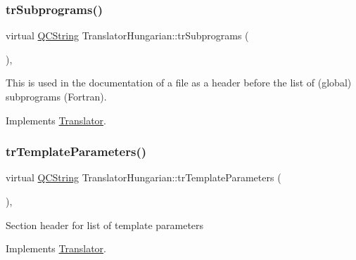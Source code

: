 \mbox{\label{class_translator_hungarian_a309a93a95df91978982b835f764ff20d}} 
\subsubsection{\texorpdfstring{trSubprograms()}{trSubprograms()}}
{\footnotesize\ttfamily virtual \mbox{\hyperlink{class_q_c_string}{Q\+C\+String}} Translator\+Hungarian\+::tr\+Subprograms (\begin{DoxyParamCaption}{ }\end{DoxyParamCaption})\hspace{0.3cm}{\ttfamily [inline]}, {\ttfamily [virtual]}}

This is used in the documentation of a file as a header before the list of (global) subprograms (Fortran). 

Implements \mbox{\hyperlink{class_translator}{Translator}}.

\mbox{\label{class_translator_hungarian_a2aa583d0e75d803f649480ce817edf88}} 
\subsubsection{\texorpdfstring{trTemplateParameters()}{trTemplateParameters()}}
{\footnotesize\ttfamily virtual \mbox{\hyperlink{class_q_c_string}{Q\+C\+String}} Translator\+Hungarian\+::tr\+Template\+Parameters (\begin{DoxyParamCaption}{ }\end{DoxyParamCaption})\hspace{0.3cm}{\ttfamily [inline]}, {\ttfamily [virtual]}}

Section header for list of template parameters 

Implements \mbox{\hyperlink{class_translator}{Translator}}.

\mbox{\label{class_translator_hungarian_a50c5d8ece3ea228c13dfad121366a1a0}} 

